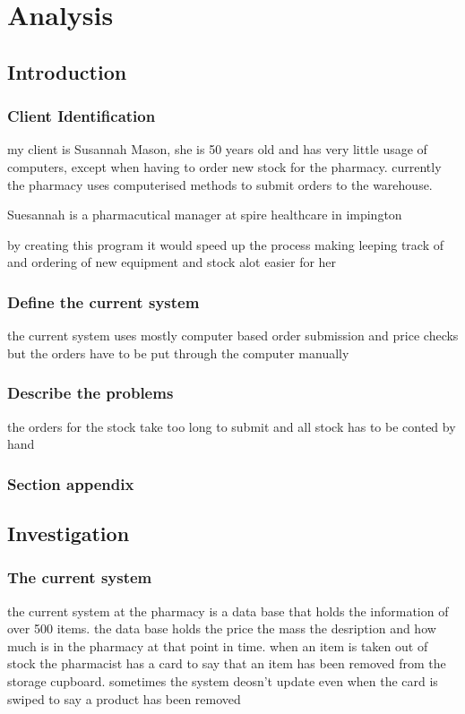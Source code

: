 \chapter{Analysis}

\section{Introduction}

\subsection{Client Identification}
my client is Susannah Mason, she is 50 years old and has very little usage of computers, except when having to order new stock for the pharmacy. currently the pharmacy uses computerised methods to submit orders to the warehouse.

Suesannah is a pharmacutical manager at spire healthcare in impington 

by  creating this program it would speed up the process making leeping track of and ordering of new equipment and stock alot easier for her 
\subsection{Define the current system}
 the current system uses mostly computer based order submission and price checks but the orders have to be put through the computer manually 
\subsection{Describe the problems}
the orders for the stock take too long to submit and all stock has to be conted by hand 
\subsection{Section appendix}

\section{Investigation}
\subsection{The current system}
the current system at the pharmacy is a data base that holds the information of over 500 items. the data base holds the price the mass the desription and how much is in the pharmacy at that point in time. when an item is taken out of stock the pharmacist has a card to say that an item has been removed from the storage cupboard. sometimes the system deosn't update even when the card is swiped to say a product has been removed
